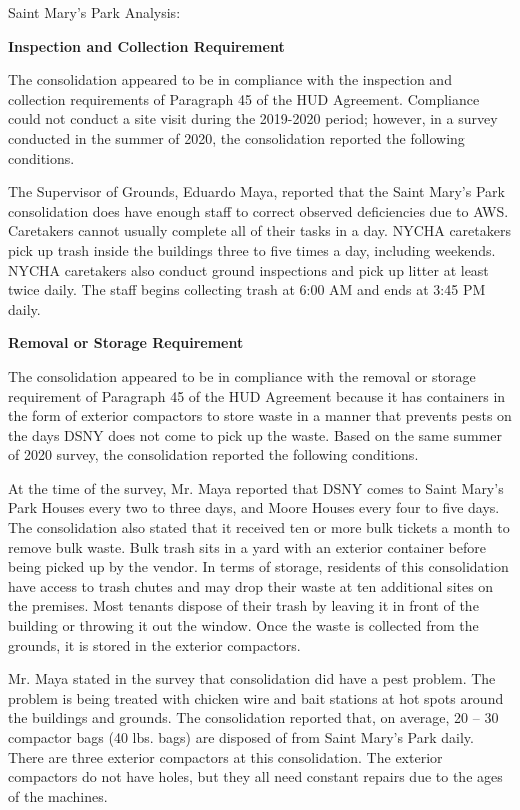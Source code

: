 Saint Mary's Park Analysis: 

\textbf{Inspection and Collection Requirement} 

 

The consolidation appeared to be in compliance with the inspection and collection requirements of Paragraph 45 of the HUD Agreement. Compliance could not conduct a site visit during the 2019-2020 period; however, in a survey conducted in the summer of 2020, the consolidation reported the following conditions.

The Supervisor of Grounds, Eduardo Maya, reported that the Saint Mary's Park consolidation does have enough staff to correct observed deficiencies due to AWS. Caretakers cannot usually complete all of their tasks in a day. NYCHA caretakers pick up trash inside the buildings three to five times a day, including weekends. NYCHA caretakers also conduct ground inspections and pick up litter at least twice daily. The staff begins collecting trash at 6:00 AM and ends at 3:45 PM daily.

\textbf{Removal or Storage Requirement} 

The consolidation appeared to be in compliance with the removal or storage requirement of Paragraph  45 of the HUD Agreement because it has containers in the form of exterior compactors to store waste in a manner that prevents pests on the days DSNY does not come to pick up the waste. Based on the same summer of  2020  survey, the consolidation reported the following conditions.

 

At the time of the survey, Mr. Maya reported that DSNY comes to Saint Mary's Park Houses every two to three days, and Moore Houses every four to five days. The consolidation also stated that it received ten or more bulk tickets a month to remove bulk waste. Bulk trash sits in a yard with an exterior container before being picked up by the vendor. In terms of storage, residents of this consolidation have access to trash chutes and may drop their waste at ten additional sites on the premises. Most tenants dispose of their trash by leaving it in front of the building or throwing it out the window. Once the waste is collected from the grounds, it is stored in the exterior compactors.  

 

Mr. Maya stated in the survey that consolidation did have a pest problem. The problem is being treated with chicken wire and bait stations at hot spots around the buildings and grounds. The consolidation reported that, on average, 20 -- 30 compactor bags (40 lbs. bags)  are disposed of from Saint Mary's Park daily. There are three exterior compactors at this consolidation. The exterior compactors do not have holes, but they all need constant repairs due to the ages of the machines. 

